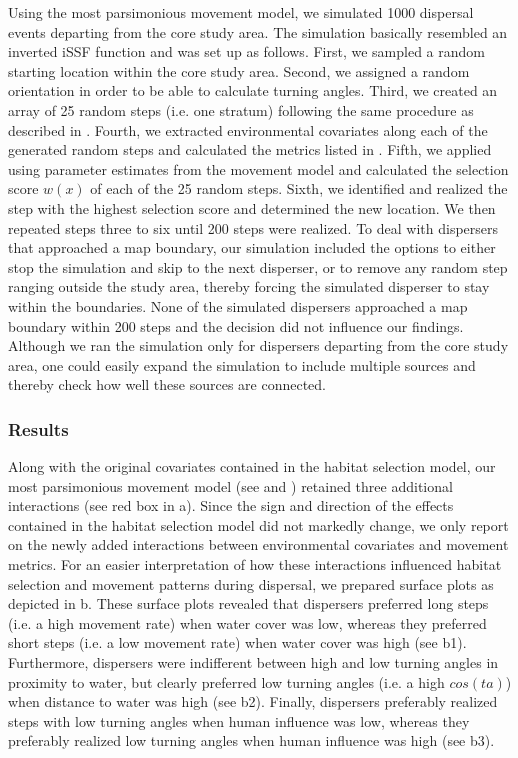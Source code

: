 \documentclass[abstract=on,10pt,a4paper,bibliography=totocnumbered]{scrartcl}
\begin{document}
Using the most parsimonious movement model, we simulated 1000 dispersal events
departing from the core study area. The simulation basically resembled an
inverted iSSF function and was set up as follows. First, we sampled a random
starting location within the core study area. Second, we assigned a random
orientation in order to be able to calculate turning angles. Third, we created
an array of 25 random steps (i.e. one stratum) following the same procedure as
described in . Fourth, we extracted environmental covariates
along each of the generated random steps and calculated the metrics listed in
. Fifth, we applied  using parameter estimates
from the movement model and calculated the selection score \(w(x)\) of each of
the 25 random steps. Sixth, we identified and realized the step with the highest
selection score and determined the new location. We then repeated steps three to
six until 200 steps were realized. To deal with dispersers that approached a map
boundary, our simulation included the options to either stop the simulation and
skip to the next disperser, or to remove any random step ranging outside the
study area, thereby forcing the simulated disperser to stay within the
boundaries. None of the simulated dispersers approached a map boundary within
200 steps and the decision did not influence our findings. Although we ran the
simulation only for dispersers departing from the core study area, one could
easily expand the simulation to include multiple sources and thereby check how
well these sources are connected.

\newpage
\subsubsection{Results}
Along with the original covariates contained in the habitat selection model, our
most parsimonious movement model (see  and
) retained three additional interactions (see red box
in a). Since the sign and direction of the effects contained
in the habitat selection model did not markedly change, we only report on the
newly added interactions between environmental covariates and movement metrics.
For an easier interpretation of how these interactions influenced habitat
selection and movement patterns during dispersal, we prepared surface plots as
depicted in b. These surface plots revealed that dispersers
preferred long steps (i.e. a high movement rate) when water cover was low,
whereas they preferred short steps (i.e. a low movement rate) when water cover
was high (see b1). Furthermore, dispersers were indifferent
between high and low turning angles in proximity to water, but clearly preferred
low turning angles (i.e. a high \(cos(ta)\)) when distance to water was high
(see b2). Finally, dispersers preferably realized steps with
low turning angles when human influence was low, whereas they preferably
realized low turning angles when human influence was high (see
b3).
\end{document}
